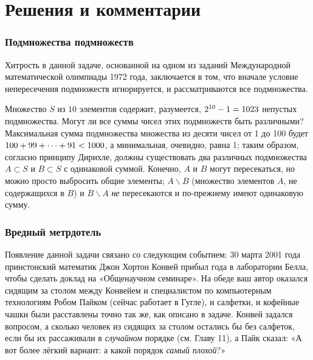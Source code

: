 \section*{Решения и комментарии}

\subsubsection*{Подмножества подмножеств}%

Хитрость в данной задаче, основанной на одном из заданий Международной математической олимпиады 1972 года, заключается в том, что вначале условие непересечения подмножеств игнорируется, и рассматриваются все подмножества.

\medskip

Множество $S$ из $10$ элементов содержит, разумеется, $2^{10} - 1 \z= 1023$ непустых подмножества.
Могут ли все суммы чисел этих подмножеств быть различными?
Максимальная сумма подмножества множества из десяти чисел от 1 до 100 будет 
$100+99+\dots+91\z<1000$, а минимальная, очевидно, равна 1; таким образом, согласно принципу Дирихле, должны существовать два различных подмножества $A\subset S$ и $B\subset S$ 
с одинаковой суммой.
Конечно, $A$ и $B$ могут пересекаться, но можно просто выбросить общие элементы;
$A\backslash B$ (множество элементов $A$, не содержащихся в $B$) и $B\backslash A$ \emph{не} пересекаются и по-прежнему имеют одинаковую сумму.\heart

\subsubsection*{Вредный метрдотель}%

Появление данной задачи связано со следующим событием:
30 марта 2001 года принстонский математик Джон Хортон Конвей %
прибыл года в лаборатории Белла, %
чтобы сделать доклад на «Общенаучном семинаре». %
На обеде ваш автор оказался сидящим за столом между Конвейем и специалистом по компьютерным технологиям Робом Пайком %
(сейчас работает в Гугле), и салфетки, и кофейные чашки были расставлены точно так же, как описано в задаче.
Конвей задался вопросом, а сколько человек из
сидящих за столом остались бы без салфеток, если бы их рассаживали в \emph{случайном} порядке (см. Главу 11), а Пайк сказал: «А вот более лёгкий вариант: а какой порядок \emph{самый плохой}?»

\bigskip

